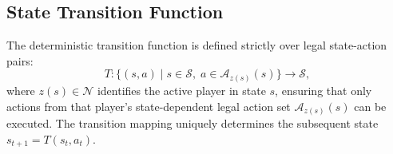 \documentclass{article}
\begin{document}
\subsection{State Transition Function}
\label{subsec:state_transition}

The deterministic transition function is defined strictly over legal state-action pairs:
\begin{equation}
T : \big\{ (s, a) \;\big|\; s \in \mathcal{S}, \; a \in \mathcal{A}_{z(s)}(s) \big\} \rightarrow \mathcal{S},
\end{equation}
where $z(s) \in \mathcal{N}$ identifies the active player in state $s$, ensuring that only actions from that player's state-dependent legal action set $\mathcal{A}_{z(s)}(s)$ can be executed. The transition mapping uniquely determines the subsequent state $s_{t+1} = T(s_t, a_t)$.
\end{document}
